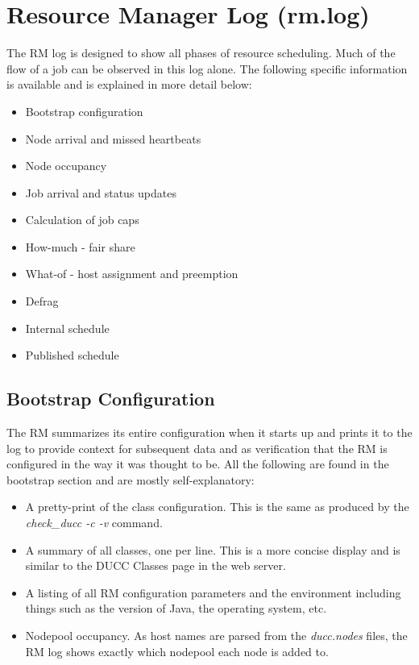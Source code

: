 \section{Resource Manager Log (rm.log)}

    The RM log is designed to show all phases of resource scheduling.  Much of the flow of a job can
    be observed in this log alone.  The following specific information is available and is explained in
    more detail below:
    \begin{itemize}
      \item Bootstrap configuration
      \item Node arrival and missed heartbeats
      \item Node occupancy
      \item Job arrival and status updates
      \item Calculation of job caps
      \item How-much - fair share 
      \item What-of - host assignment and preemption
      \item Defrag
      \item Internal schedule
      \item Published schedule
    \end{itemize}
    
\subsection{Bootstrap Configuration}
   The RM summarizes its entire configuration when it starts up and prints it to the log to
   provide context for subsequent data and as verification that the RM is configured in the
   way it was thought to be.  All the following are found in the bootstrap section and are mostly
   self-explanatory:

   \begin{itemize}
     \item A pretty-print of the class configuration.  This is the same as produced by the {\em check\_ducc -c -v} 
       command.
     \item A summary of all classes, one per line.  This is a more concise display and is similar to the
       DUCC Classes page in the web server.
     \item A listing of all RM configuration parameters and the environment including things such as the
       version of Java, the operating system, etc.
     \item Nodepool occupancy.  As host names are parsed from the {\em ducc.nodes} files, the RM log
       shows exactly which nodepool each node is added to.
   \end{itemize}
   
